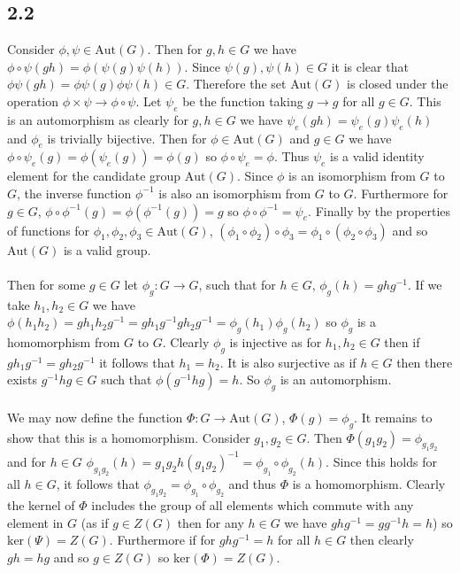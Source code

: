 \documentclass{article}
\begin{document}
\subsection*{2.2}
Consider $\phi,\psi \in \text{Aut}(G)$. Then for $g,h \in G$ we have $\phi \circ \psi(gh) = \phi(\psi(g)\psi(h))$. 
Since $\psi(g),\psi(h) \in G$ it is clear that $\phi\psi(gh) = \phi\psi(g)\phi\psi(h) \in G$. Therefore the set $\text{Aut}(G)$ is closed under the operation $\phi \times \psi \rightarrow \phi \circ \psi$. 
Let $\psi_e$ be the function taking $g \rightarrow g$ for all $g \in G$. This is an automorphism as 
clearly for $g,h \in G$ we have $\psi_e(gh) = \psi_e(g)\psi_e(h)$ and $\phi_e$ is trivially bijective. Then for $\phi \in \text{Aut}(G)$ and 
$g \in G$ we have $\phi \circ \psi_e(g) = \phi(\psi_e(g)) = \phi(g)$ so $\phi \circ \psi_e = \phi$. Thus 
$\psi_e$ is a valid identity element for the candidate group $\text{Aut}(G)$.
Since $\phi$ is an isomorphism from $G$ to $G$, the inverse function $\phi^{-1}$ is also an isomorphism 
from $G$ to $G$. Furthermore for $g \in G$, $\phi\circ\phi^{-1}(g) = \phi(\phi^{-1}(g)) = g$ so 
$\phi\circ\phi^{-1} = \psi_e$. Finally by the properties of functions for $\phi_1,\phi_2,\phi_3 \in \text{Aut}(G)$, 
$(\phi_1 \circ \phi_2) \circ \phi_3 = \phi_1 \circ (\phi_2 \circ \phi_3)$ and so $\text{Aut}(G)$ is a valid 
group.

\paragraph{}
Then for some $g \in G$ let $\phi_g: G \rightarrow G$, such that for $h \in G$, $\phi_g(h) = ghg^{-1}$. 
If we take $h_1,h_2 \in G$ we have $\phi(h_1h_2) = gh_1h_2g^{-1} = gh_1g^{-1}gh_2g^{-1} = \phi_g(h_1)\phi_g(h_2)$ 
so $\phi_g$ is a homomorphism from $G$ to $G$. Clearly $\phi_g$ is injective as for $h_1,h_2 \in G$ 
then if $gh_1g^{-1} = gh_2g^{-1}$ it follows that $h_1 = h_2$. It is also surjective as if 
$h \in G$ then there exists $g^{-1}hg \in G$ such that $\phi(g^{-1}hg) = h$. So $\phi_g$ is an 
automorphism.

\paragraph{}
We may now define the function $\Phi:G\rightarrow \text{Aut}(G)$, $\Phi(g) = \phi_g$. It remains to show that this is 
a homomorphism. Consider $g_1,g_2 \in G$. Then $\Phi(g_1g_2) = \phi_{g_1g_2}$ and for $h \in G$ 
$\phi_{g_1g_2}(h) = g_1g_2h(g_1g_2)^{-1} = \phi_{g_1} \circ \phi_{g_2}(h)$. Since this holds for 
all $h \in G$, it follows that $\phi_{g_1g_2} = \phi_{g_1} \circ \phi_{g_2}$ and thus $\Phi$ is a 
homomorphism. Clearly the kernel of $\Phi$ includes the group of all elements which commute with any 
element in $G$ (as if $g \in Z(G)$ then for any $h \in G$ we have $ghg^{-1} = gg^{-1}h = h$) so 
$\text{ker}(\Psi) = Z(G)$. Furthermore if for $ghg^{-1} = h$ for all $h \in G$ then clearly $gh = hg$ and 
so $g \in Z(G)$ so $\text{ker}(\Phi) = Z(G)$.
\end{document}
